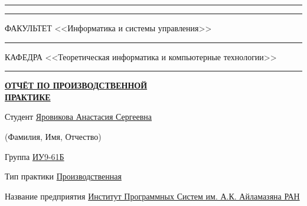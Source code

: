 \documentclass[14pt, russian]{scrartcl}
\begin{document}
\begin{titlepage}
\vspace{-2pt}
\hspace{-34.5pt}\rule{\textwidth}{0.5pt}

\vspace*{-18.3pt}
\hspace{-34.5pt}\rule{\textwidth}{2.5pt}
 
\vspace{0.5ex}
\noindent \small ФАКУЛЬТЕТ\hspace{80pt} <<Информатика и системы управления>>

\vspace*{-16pt}
\hspace{35pt}\rule{0.855\textwidth}{0.4pt}

\vspace{0.5ex}
\noindent \small КАФЕДРА\hspace{50pt} <<Теоретическая информатика и компьютерные технологии>>

\vspace*{-16pt}
\hspace{25pt}\rule{0.875\textwidth}{0.4pt}
 
 
\vspace{3em}
 
\begin{center}
\Large {\textbf{\uline{ОТЧЁТ ПО ПРОИЗВОДСТВЕННОЙ}}} \\ {\textbf{\uline{ПРАКТИКЕ}}}
\end{center}\normalsize

\vspace{2ex}
\noindent Студент \underline{\hspace{16pt}\footnotesize Яровикова  Анастасия  Сергеевна\hspace{228pt}}\normalsize

\vspace{-1.8ex}
\noindent\hspace{31ex} \scriptsize{(Фамилия, Имя, Отчество)}\normalsize

\vspace{0.7ex}
\noindent Группа \underline{\hspace{16pt}\footnotesize ИУ9-61Б\hspace{50pt}}\normalsize

\vspace{2ex}
\noindent Тип практики \underline{\hspace{16pt}\footnotesize Производственная\hspace{265pt}}\normalsize

\vspace{2.5ex}
\noindent Название предприятия \underline{\hspace{16pt}\footnotesize Институт Программных Систем им. А.К. Айламазяна РАН\hspace{12pt}}\normalsize


\end{titlepage}
\end{document}
